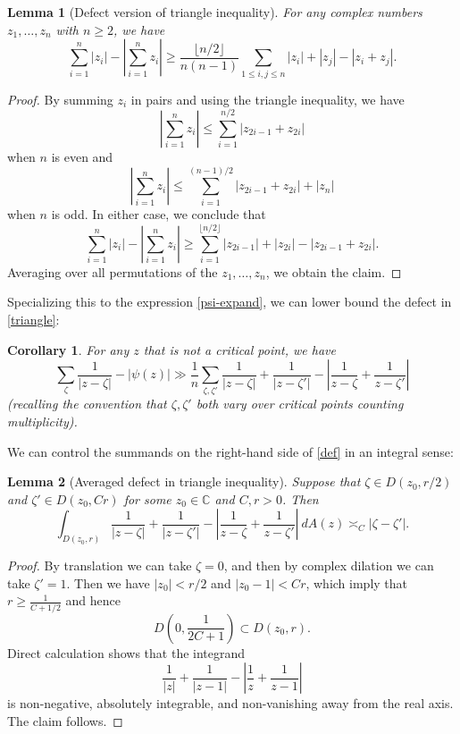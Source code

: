 \documentclass[12pt]{amsart}
\newtheorem{lemma}{Lemma}[section]
\newtheorem{corollary}{Corollary}[section]
\newcommand{\C}{\mathbb{C}}
\begin{document}
\begin{lemma}[Defect version of triangle inequality]\label{defect}  For any complex numbers $z_1,\dots,z_n$ with $n \geq 2$, we have
$$ \sum_{i=1}^n |z_i| - \left|\sum_{i=1}^n z_i\right| \geq \frac{\lfloor n/2 \rfloor}{n(n-1)} \sum_{1 \leq i,j \leq n} |z_i| + |z_j| - |z_i+z_j|.$$
\end{lemma}

\begin{proof} By summing $z_i$ in pairs and using the triangle inequality, we have
$$ \left|\sum_{i=1}^n z_i\right| \leq \sum_{i=1}^{n/2} |z_{2i-1} + z_{2i}| $$
when $n$ is even and
$$ \left|\sum_{i=1}^n z_i\right| \leq \sum_{i=1}^{(n-1)/2} |z_{2i-1} + z_{2i}| + |z_n|$$
when $n$ is odd.  In either case, we conclude that
$$ \sum_{i=1}^n |z_i| - \left|\sum_{i=1}^n z_i\right| \geq \sum_{i=1}^{\lfloor n/2\rfloor} |z_{2i-1}| + |z_{2i}| - |z_{2i-1} + z_{2i}|.$$
Averaging over all permutations of the $z_1,\dots,z_n$, we obtain the claim.
\end{proof}

Specializing this to the expression \eqref{psi-expand}, we can lower bound the defect in \eqref{triangle}:

\begin{corollary}\label{defect-psi}  For any $z$ that is not a critical point, we have
\begin{equation}\label{def}
 \sum_\zeta \frac{1}{|z-\zeta|} - |\psi(z)| \gg \frac{1}{n} \sum_{\zeta,\zeta'} \frac{1}{|z-\zeta|} + \frac{1}{|z-\zeta'|} - \left| \frac{1}{z-\zeta} + \frac{1}{z-\zeta'}  \right|
\end{equation}
(recalling the convention that $\zeta, \zeta'$ both vary over critical points counting multiplicity).
\end{corollary}

We can control the summands on the right-hand side of \eqref{def} in an integral sense:

\begin{lemma}[Averaged defect in triangle inequality]\label{tridef}  Suppose that $\zeta \in D(z_0,r/2)$ and $\zeta' \in D(z_0, Cr)$ for some $z_0 \in \C$ and $C, r > 0$.  Then
$$ \int_{D(z_0,r)} \frac{1}{|z-\zeta|} + \frac{1}{|z-\zeta'|} - \left| \frac{1}{z-\zeta} + \frac{1}{z-\zeta'}  \right|\ dA(z) \asymp_C |\zeta-\zeta'|.$$
\end{lemma}

\begin{proof} By translation we can take $\zeta=0$, and then by complex dilation we can take $\zeta'=1$.  Then we have $|z_0| < r/2$ and $|z_0-1| < Cr$, which imply that $r \geq \frac{1}{C+1/2}$ and hence
$$ D\left(0,\frac{1}{2C+1}\right) \subset D(z_0,r).$$
Direct calculation shows that the integrand
$$ \frac{1}{|z|} + \frac{1}{|z-1|} - \left| \frac{1}{z} + \frac{1}{z-1}  \right|$$
is non-negative, absolutely integrable, and non-vanishing away from the real axis.  The claim follows.
\end{proof}
\end{document}
